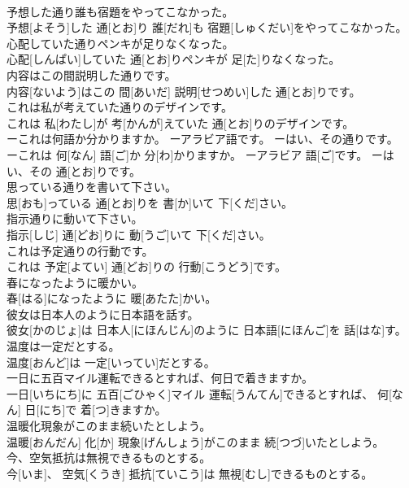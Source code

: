 \documentclass[8pt]{extreport}
\begin{document}
\begin{CJK}{UTF8}{min}
\\	予想した通り誰も宿題をやってこなかった。	
\\	予想[よそう]した 通[とお]り 誰[だれ]も 宿題[しゅくだい]をやってこなかった。
\\	心配していた通りペンキが足りなくなった。	
\\	心配[しんぱい]していた 通[とお]りペンキが 足[た]りなくなった。
\\	内容はこの間説明した通りです。	
\\	内容[ないよう]はこの 間[あいだ] 説明[せつめい]した 通[とお]りです。
\\	これは私が考えていた通りのデザインです。	
\\	これは 私[わたし]が 考[かんが]えていた 通[とお]りのデザインです。
\\	ーこれは何語か分かりますか。 ーアラビア語です。 ーはい、その通りです。	
\\	ーこれは 何[なん] 語[ご]か 分[わ]かりますか。 ーアラビア 語[ご]です。 ーはい、その 通[とお]りです。
\\	思っている通りを書いて下さい。	
\\	思[おも]っている 通[とお]りを 書[か]いて 下[くだ]さい。
\\	指示通りに動いて下さい。	
\\	指示[しじ] 通[どお]りに 動[うご]いて 下[くだ]さい。
\\	これは予定通りの行動です。	
\\	これは 予定[よてい] 通[どお]りの 行動[こうどう]です。
\\	春になったように暖かい。	
\\	春[はる]になったように 暖[あたた]かい。
\\	彼女は日本人のように日本語を話す。	
\\	彼女[かのじょ]は 日本人[にほんじん]のように 日本語[にほんご]を 話[はな]す。
\\	温度は一定だとする。	
\\	温度[おんど]は 一定[いってい]だとする。
\\	一日に五百マイル運転できるとすれば、何日で着きますか。	
\\	一日[いちにち]に 五百[ごひゃく]マイル 運転[うんてん]できるとすれば、 何[なん] 日[にち]で 着[つ]きますか。
\\	温暖化現象がこのまま続いたとしよう。	
\\	温暖[おんだん] 化[か] 現象[げんしょう]がこのまま 続[つづ]いたとしよう。
\\	今、空気抵抗は無視できるものとする。	
\\	今[いま]、 空気[くうき] 抵抗[ていこう]は 無視[むし]できるものとする。

\end{CJK}
\end{document}
